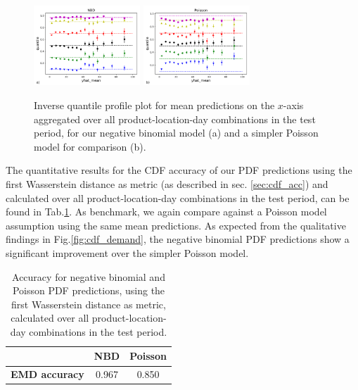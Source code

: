 \documentclass[BCOR=1mm, DIV=calc,10pt,
twoside=true,
twocolumn,
headings=normal]{scrartcl}
\newcommand{\fig}{Fig.}
\newcommand{\tab}{Tab.}
\begin{document}
\begin{figure}
\begin{center}
\includegraphics[width=4cm]{../figures/invquant_yhat_mean_nbinom}
\includegraphics[width=4cm]{../figures/invquant_yhat_mean_poisson}
\caption{\label{fig:invquant_mean} Inverse quantile profile plot for mean predictions on the $x$-axis aggregated over all product-location-day combinations in the test period, for our negative binomial model (a) and a simpler Poisson model for comparison (b).}
\end{center}
\end{figure}

The quantitative results for the CDF accuracy of our PDF predictions using the first Wasserstein distance as metric (as described in sec. \ref{sec:cdf_acc}) and calculated over all product-location-day combinations in the test period, can be found in \tab \ref{tab:cdf_acc}. As benchmark, we again compare against a Poisson model assumption using the same mean predictions. As expected from the qualitative findings in \fig \ref{fig:cdf_demand}, the negative binomial PDF predictions show a significant improvement over the simpler Poisson model.

\begin{table}[h!]
\begin{center}
\caption{Accuracy for negative binomial and Poisson PDF predictions, using the first Wasserstein distance as metric, calculated over all product-location-day combinations in the test period.}
\label{tab:cdf_acc}
\begin{tabular}{c|c|c}
 & \textbf{NBD} & \textbf{Poisson} \\
\hline
\textbf{EMD accuracy} & 0.967 & 0.850
\end{tabular}
\end{center}
\end{table}
\end{document}
